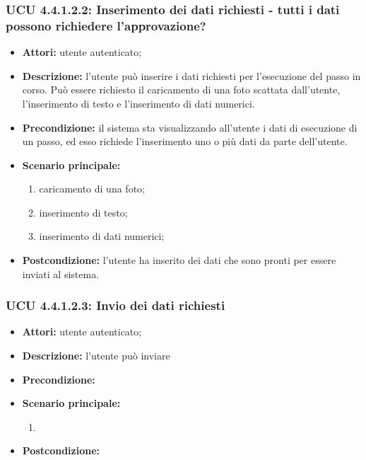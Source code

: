 \subsubsection{UCU 4.4.1.2.2: Inserimento dei dati richiesti - tutti i dati possono richiedere l'approvazione?}
\begin{itemize}
\item \textbf{Attori:} utente autenticato;
\item \textbf{Descrizione:} l'utente può inserire i dati richiesti per l'esecuzione del passo in corso. Può essere richiesto il caricamento di una foto scattata dall'utente, l'inserimento di testo e l'inserimento di dati numerici.
\item \textbf{Precondizione:} il sistema sta visualizzando all'utente i dati di esecuzione di un passo, ed esso richiede l'inserimento uno o più dati da parte dell'utente.
\item \textbf{Scenario principale:}
\begin{enumerate}
\item caricamento di una foto;
\item inserimento di testo;
\item inserimento di dati numerici;
\end{enumerate}
\item \textbf{Postcondizione:} l'utente ha inserito dei dati che sono pronti per essere inviati al sistema.
\end{itemize}

\subsubsection{UCU 4.4.1.2.3: Invio dei dati richiesti}
\begin{itemize}
\item \textbf{Attori:} utente autenticato;
\item \textbf{Descrizione:} l'utente può inviare 
\item \textbf{Precondizione:}
\item \textbf{Scenario principale:}
\begin{enumerate}
\item
\end{enumerate}
\item \textbf{Postcondizione:}
\end{itemize}

